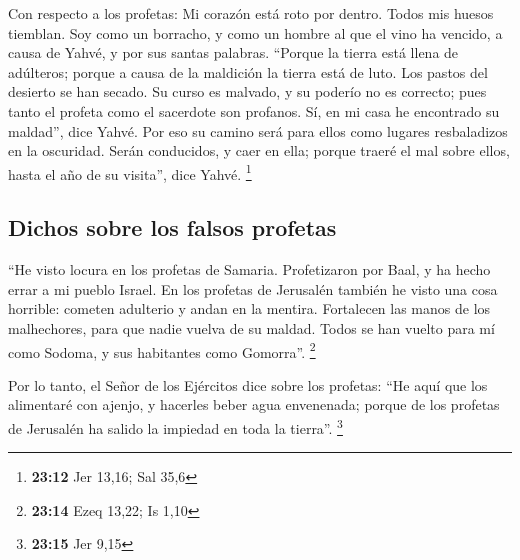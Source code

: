  Con respecto a los profetas: Mi corazón está roto por
dentro. Todos mis huesos tiemblan. Soy como un borracho, y como un
hombre al que el vino ha vencido, a causa de Yahvé, y por sus santas
palabras.  ``Porque la tierra está llena de adúlteros;
porque a causa de la maldición la tierra está de luto. Los pastos del
desierto se han secado. Su curso es malvado, y su poderío no es
correcto;  pues tanto el profeta como el sacerdote son
profanos. Sí, en mi casa he encontrado su maldad'', dice Yahvé.
 Por eso su camino será para ellos como lugares
resbaladizos en la oscuridad. Serán conducidos, y caer en ella; porque
traeré el mal sobre ellos, hasta el año de su visita'', dice Yahvé.
\footnote{\textbf{23:12} Jer 13,16; Sal 35,6}

\hypertarget{dichos-sobre-los-falsos-profetas}{%
\subsection{Dichos sobre los falsos
profetas}\label{dichos-sobre-los-falsos-profetas}}

 ``He visto locura en los profetas de Samaria.
Profetizaron por Baal, y ha hecho errar a mi pueblo Israel.
 En los profetas de Jerusalén también he visto una cosa
horrible: cometen adulterio y andan en la mentira. Fortalecen las manos
de los malhechores, para que nadie vuelva de su maldad. Todos se han
vuelto para mí como Sodoma, y sus habitantes como Gomorra''. \footnote{\textbf{23:14}
  Ezeq 13,22; Is 1,10}

 Por lo tanto, el Señor de los Ejércitos dice sobre los
profetas: ``He aquí que los alimentaré con ajenjo, y hacerles beber agua
envenenada; porque de los profetas de Jerusalén ha salido la impiedad en
toda la tierra''. \footnote{\textbf{23:15} Jer 9,15}

